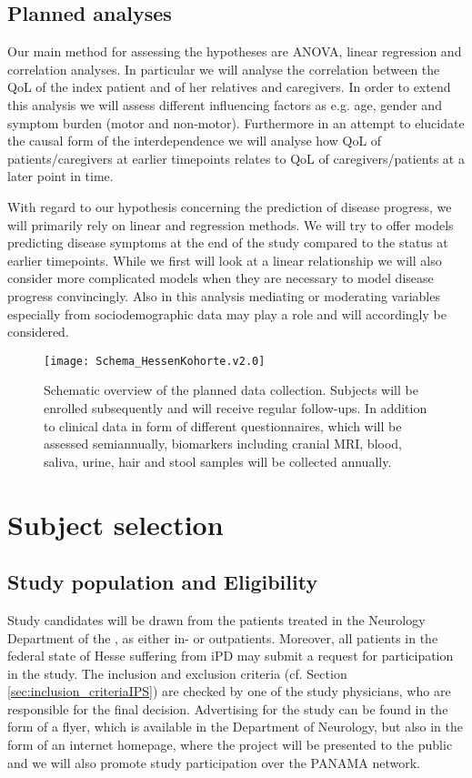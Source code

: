 \subsection{Planned analyses}
Our main method for assessing the hypotheses are \ac{ANOVA}, linear regression and correlation analyses. In particular we will analyse the correlation between the \ac{QoL} of the index patient and of her relatives and caregivers. In order to extend this analysis we will assess different influencing factors as e.g. age, gender and symptom burden (motor and non-motor). Furthermore in an attempt to elucidate the causal form of the interdependence we will analyse how \ac{QoL} of patients/caregivers at earlier timepoints relates to \ac{QoL} of caregivers/patients at a later point in time.

With regard to our hypothesis concerning the prediction of disease progress, we will primarily rely on linear and regression methods. We will try to offer models predicting disease symptoms at the end of the study compared to the status at earlier timepoints. While we first will look at a linear relationship we will also consider more complicated models when they are necessary to model disease progress convincingly. Also in this analysis mediating or moderating variables especially from sociodemographic data may play a role and will accordingly be considered.

\begin{figure}[h]
\label{fig2:scheme}
\centering
\texttt{[image: Schema\_HessenKohorte.v2.0]}
\caption{Schematic overview of the planned data collection. Subjects will be enrolled subsequently and will receive regular follow-ups. In addition to clinical data in form of different questionnaires, which will be assessed semiannually, biomarkers including cranial \ac{MRI}, blood, saliva, urine, hair and stool samples will be collected annually.}
\end{figure}


\section{Subject selection}
\label{sec:study_selection}
\subsection{Study population and Eligibility}
\label{sec:study_population}
Study candidates will be drawn from the patients treated in the Neurology Department of the \UKM, as either in- or outpatients. Moreover, all patients in the federal state of Hesse suffering from \ac{iPD} may submit a request for participation in the study. The inclusion and exclusion criteria (cf. Section \ref{sec:inclusion_criteriaIPS}) are checked by one of the study physicians, who are responsible for the final decision. Advertising for the study can be found in the form of a flyer, which is available in the Department of Neurology, but also in the form of an internet homepage, where the project will be presented to the public and we will also promote study participation over the \ac{PANAMA} network.

